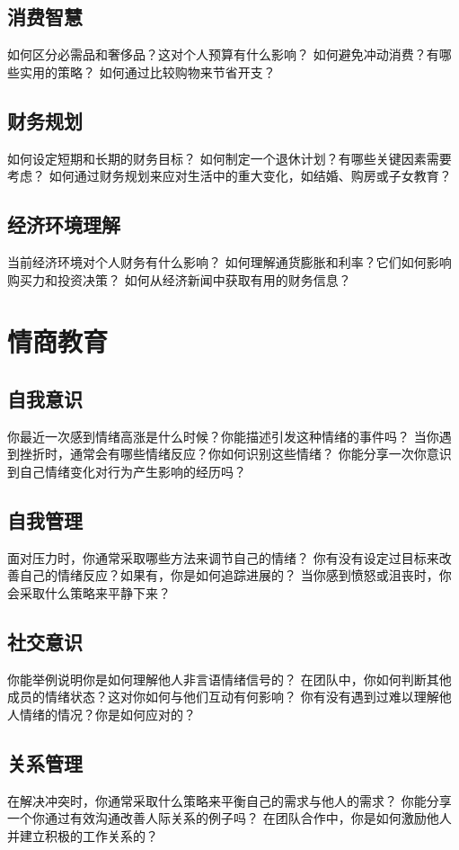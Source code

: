 \documentclass[12pt]{book}
\begin{document}
\subsection{消费智慧}
如何区分必需品和奢侈品？这对个人预算有什么影响？
如何避免冲动消费？有哪些实用的策略？
如何通过比较购物来节省开支？

\subsection{财务规划}
如何设定短期和长期的财务目标？
如何制定一个退休计划？有哪些关键因素需要考虑？
如何通过财务规划来应对生活中的重大变化，如结婚、购房或子女教育？

\subsection{经济环境理解}
当前经济环境对个人财务有什么影响？
如何理解通货膨胀和利率？它们如何影响购买力和投资决策？
如何从经济新闻中获取有用的财务信息？


\section{情商教育}
\subsection{自我意识}

你最近一次感到情绪高涨是什么时候？你能描述引发这种情绪的事件吗？
当你遇到挫折时，通常会有哪些情绪反应？你如何识别这些情绪？
你能分享一次你意识到自己情绪变化对行为产生影响的经历吗？

\subsection{自我管理}
面对压力时，你通常采取哪些方法来调节自己的情绪？
你有没有设定过目标来改善自己的情绪反应？如果有，你是如何追踪进展的？
当你感到愤怒或沮丧时，你会采取什么策略来平静下来？

\subsection{社交意识}
你能举例说明你是如何理解他人非言语情绪信号的？
在团队中，你如何判断其他成员的情绪状态？这对你如何与他们互动有何影响？
你有没有遇到过难以理解他人情绪的情况？你是如何应对的？

\subsection{关系管理}
在解决冲突时，你通常采取什么策略来平衡自己的需求与他人的需求？
你能分享一个你通过有效沟通改善人际关系的例子吗？
在团队合作中，你是如何激励他人并建立积极的工作关系的？
\end{document}
